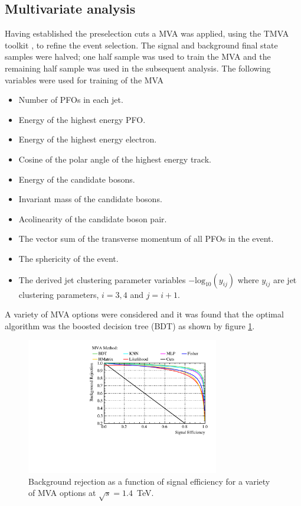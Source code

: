 
\subsection{Multivariate analysis}
\label{sec:mva1400GeV}
Having established the preselection cuts a MVA was applied, using the TMVA toolkit \cite{Hocker:2007ht}, to refine the event selection.  The signal and background final state samples were halved; one half sample was used to train the MVA and the remaining half sample was used in the subsequent analysis.  The following variables were used for training of the MVA
\begin{itemize}
\item Number of PFOs in each jet. 
\item Energy of the highest energy PFO.
\item Energy of the highest energy electron.
\item Cosine of the polar angle of the highest energy track.
\item Energy of the candidate bosons.
\item Invariant mass of the candidate bosons.
\item Acolinearity of the candidate boson pair.
\item The vector sum of the transverse momentum of all PFOs in the event. 
\item The sphericity of the event. 
\item The derived jet clustering parameter variables $-\text{log}_{10}(y_{ij})$ where $y_{ij}$ are jet clustering parameters, $i = 3,4$ and $j=i+1$.  
\end{itemize}

A variety of MVA options were considered and it was found that the optimal algorithm was the boosted decision tree (BDT) as shown by figure \ref{fig:mvaalternatives1400GeV}.  

\begin{figure}
\centering
\includegraphics[width=0.75\textwidth]{PhysicsAnalysis/Plots/MVAPlots/1400GeV/ThesisPlotMVAAlternatives1400GeV.pdf}
\caption[Background rejection as a function of signal efficiency for a variety of MVA options at $\sqrt{s}=1.4$~TeV.]{Background rejection as a function of signal efficiency for a variety of MVA options at $\sqrt{s}=1.4$~TeV.} 
\label{fig:mvaalternatives1400GeV}
\end{figure}

